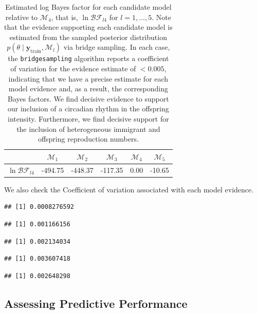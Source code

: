 \documentclass[
]{article}
\begin{document}
\begin{table}[ht]
\centering
\begin{tabular}{|l|c|c|c|c|c|}
  \hline
 & $\mathcal {M}_1$ & $\mathcal {M}_2$ & $\mathcal {M}_3$ & $\mathcal {M}_4$ & $\mathcal {M}_5$ \\ 
  \hline
$\ln \mathcal{BF}_{l4}$ & -494.75 & -448.37 & -117.35 & 0.00 & -10.65 \\ 
   \hline
\end{tabular}
\caption{Estimated log Bayes factor for each candidate model relative to $\mathcal M_4$, that is, $\ln \mathcal{BF}_{l4}$ for $l = 1, \dots, 5$. Note that the evidence supporting each candidate model is estimated from the sampled posterior distribution $p \left( \theta \mid \boldsymbol y_{\operatorname{train}}, \mathcal M_l \right)$ via bridge sampling. In each case, the \texttt{bridgesampling} algorithm reports a coefficient of variation for the evidence estimate of $<0.005$, indicating that we have a precise estimate for each model evidence and, as a result, the corresponding Bayes factors. We find decisive evidence to support our inclusion of a circadian rhythm in the offspring intensity. Furthermore, we find decisive support for the inclusion of heterogeneous immigrant and offspring reproduction numbers.} 
\label{tab:bf_estimates}
\end{table}

We also check the Coefficient of variation associated with each model
evidence.

\begin{verbatim}
## [1] 0.0008276592
\end{verbatim}

\begin{verbatim}
## [1] 0.001166156
\end{verbatim}

\begin{verbatim}
## [1] 0.002134034
\end{verbatim}

\begin{verbatim}
## [1] 0.003607418
\end{verbatim}

\begin{verbatim}
## [1] 0.002648298
\end{verbatim}

\hypertarget{assessing-predictive-performance}{%
\subsection{Assessing Predictive
Performance}\label{assessing-predictive-performance}}
\end{document}
